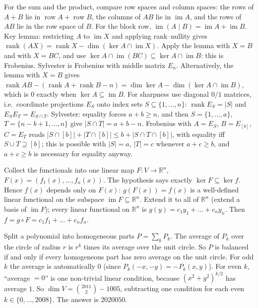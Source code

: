 \documentclass[11pt,a4paper]{article}
\begin{document}

For the sum and the product, compare row spaces and column spaces: the rows of \(A+B\) lie in \(\operatorname{row}A+\operatorname{row}B\), the columns of \(AB\) lie in \(\operatorname{im}A\), and the rows of \(AB\) lie in the row space of \(B\). For the block row, \(\operatorname{im}(A\mid B)=\operatorname{im}A+\operatorname{im}B\).
Key lemma: restricting \(A\) to \(\operatorname{im}X\) and applying rank--nullity gives \(\operatorname{rank}(AX)=\operatorname{rank}X-\dim(\ker A\cap\operatorname{im}X)\).
Apply the lemma with \(X=B\) and with \(X=BC\), and use \(\ker A\cap\operatorname{im}(BC)\subseteq\ker A\cap\operatorname{im}B\): this is Frobenius. Sylvester is Frobenius with middle matrix \(E_n\). Alternatively, the lemma with \(X=B\) gives \(\operatorname{rank}AB-(\operatorname{rank}A+\operatorname{rank}B-n)=\dim\ker A-\dim(\ker A\cap\operatorname{im}B)\), which is \(0\) exactly when \(\ker A\subseteq\operatorname{im}B\).
For sharpness use diagonal \(0/1\) matrices, i.e.~coordinate projections \(E_S\) onto index sets \(S\subseteq\{1,\dots,n\}\): \(\operatorname{rank}E_S=\lvert S\rvert\) and \(E_SE_T=E_{S\cap T}\). Sylvester: equality forces \(a+b\ge n\), and then \(S=\{1,\dots,a\}\), \(T=\{n-b+1,\dots,n\}\) give \(\lvert S\cap T\rvert=a+b-n\). Frobenius with \(A=E_S\), \(B=E_{[b]}\), \(C=E_T\) reads \(\lvert S\cap[b]\rvert+\lvert T\cap[b]\rvert\le b+\lvert S\cap T\cap[b]\rvert\), with equality iff \(S\cup T\supseteq[b]\); this is possible with \(\lvert S\rvert=a\), \(\lvert T\rvert=c\) whenever \(a+c\ge b\), and \(a+c\ge b\) is necessary for equality anyway.

Collect the functionals into one linear map \(F\colon V\to\mathbb R^n\), \(F(x)=(f_1(x),\dots,f_n(x))\). The hypothesis says exactly \(\ker F\subseteq\ker f\).
Hence \(f(x)\) depends only on \(F(x)\): \(g(F(x))=f(x)\) is a well-defined linear functional on the subspace \(\operatorname{im}F\subseteq\mathbb R^n\). Extend it to all of \(\mathbb R^n\) (extend a basis of \(\operatorname{im}F\)); every linear functional on \(\mathbb R^n\) is \(g(y)=c_1y_1+\dots+c_ny_n\). Then \(f=g\circ F=c_1f_1+\dots+c_nf_n\).

Split a polynomial into homogeneous parts \(P=\sum_k P_k\). The average of \(P_k\) over the circle of radius \(r\) is \(r^k\) times its average over the unit circle. So \(P\) is balanced if and only if every homogeneous part has zero average on the unit circle.
For odd \(k\) the average is automatically \(0\) (since \(P_k(-x,-y)=-P_k(x,y)\)). For even \(k\), ``average \(=0\)'' is one non-trivial linear condition, because \((x^2+y^2)^{k/2}\) has average \(1\).
So \(\dim V=\binom{2011}{2}-1005\), subtracting one condition for each even \(k\in\{0,\dots,2008\}\). The answer is \(2020050\).
\end{document}
